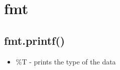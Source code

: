 \documentclass[]{article}
\title{}
\author{}
\begin{document}
\maketitle

\begin{abstract}

\end{abstract}

\section{fmt}
\subsection{fmt.printf()}
\begin{itemize}
	\item \%T - prints the type of the data 
\end{itemize}
\end{document}
